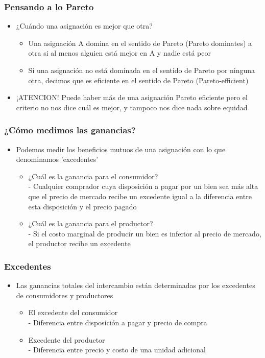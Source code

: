 \documentclass{beamer}
\begin{document}
\begin{frame}
\frametitle{ Pensando a lo Pareto}
\begin{itemize}
    \item ¿Cuándo una asignación es mejor que otra?
    \begin{itemize}
        \item Una asignación A domina en el sentido de Pareto (Pareto dominates) a otra si al menos alguien está mejor en A y nadie está peor
        \item Si una asignación no está dominada en el sentido de Pareto por ninguna otra, decimos que es eficiente en el sentido de Pareto (Pareto-efficient)
    \end{itemize}
    \item ¡ATENCION! Puede haber más de una asignación Pareto eficiente pero el criterio no nos dice cuál es mejor, y tampoco nos dice nada sobre equidad 
\end{itemize}
\end{frame}

\begin{frame}
\frametitle{¿Cómo medimos las ganancias?}
\begin{itemize}
    \item Podemos medir los beneficios mutuos de una asignación con lo que denominamos 'excedentes' 
    \begin{itemize}
        \item ¿Cuál es la ganancia para el consumidor? \\
        - Cualquier comprador cuya disposición a pagar por un bien sea más alta que el precio de mercado recibe un excedente igual a la diferencia entre esta disposición y el precio pagado
        \item ¿Cuál es la ganancia para el productor? \\
        - Si el costo marginal de producir un bien es inferior al precio de mercado, el productor recibe un excedente
    \end{itemize}
    \end{itemize}
\end{frame}

\begin{frame}
\frametitle{Excedentes}
\begin{itemize}
    \item Las ganancias totales del intercambio están determinadas por los excedentes de consumidores y productores
    \begin{itemize}
        \item El excedente del consumidor \\ - Diferencia entre disposición a pagar y precio de compra
        \item Excedente del productor \\ - Diferencia entre precio y costo de una unidad adicional
    \end{itemize}
    \end{itemize}
\end{frame}
\end{document}
